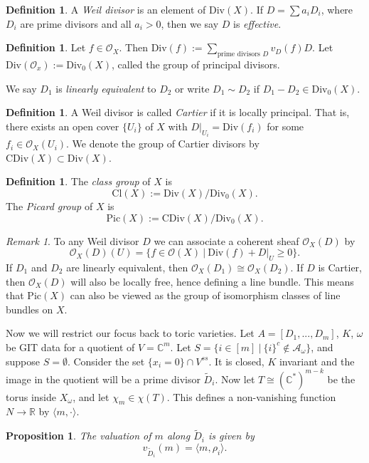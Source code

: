 \documentclass{article}
\newtheorem{prop}[theorem]{Proposition}
\theoremstyle{definition}
\newtheorem{definition}[theorem]{Definition}
\theoremstyle{remark}
\newtheorem{remark}[theorem]{Remark}
\numberwithin{theorem}{section}
\newcommand{\C}{\mathbb{C}}
\newcommand{\R}{\mathbb{R}}
\newcommand{\OO}{\mathcal{O}}
\newcommand{\cA}{\mathcal{A}}
\newcommand{\Div}{\mathrm{Div}}
\newcommand{\Pic}{\mathrm{Pic}}
\newcommand{\CDiv}{\mathrm{CDiv}}
\newcommand{\Cl}{\mathrm{Cl}}
\begin{document}
	\begin{definition}
		A \emph{Weil divisor} is an element of $\Div(X)$. If $D=\sum a_i D_i$, where $D_i$ are prime divisors and all $a_i >0$, then we say $D$ is \emph{effective}.
	\end{definition}
	\begin{definition}
		Let $f \in \mathcal{O}_X$. Then $\Div(f):=\sum_{\text{prime divisors }D}v_D(f)D$. Let $\Div(\mathcal{O}_x):=\Div_0(X)$, called the group of principal divisors. \vspace{1em}

		We say $D_1$ is \emph{linearly equivalent} to $D_2$ or write $D_1\sim D_2$ if $D_1-D_2 \in \Div_0(X)$. 
	\end{definition}
	\begin{definition}
		A Weil divisor is called \emph{Cartier} if it is locally principal. That is, there exists an open cover $\{U_i\}$ of $X$ with $D|_{U_i} = \Div(f_i)$ for some $f_i \in \mathcal{O}_X(U_i)$. We denote the group of Cartier divisors by $\CDiv(X)\subset \Div(X)$. 
	\end{definition}
	\begin{definition}
		The \emph{class group} of $X$ is
		$$\Cl(X) := \Div(X)/\Div_0(X).$$
		The \emph{Picard group} of $X$ is 
		$$\Pic(X) := \CDiv(X)/\Div_0(X).$$
	\end{definition}
	\begin{remark}
		To any Weil divisor $D$ we can associate a coherent sheaf $\OO_X(D)$ by
		$$\OO_X(D)(U) = \{f\in \OO(X) ~|~ \Div(f)+D|_U \geq 0 \}.$$
		If $D_1$ and $D_2$ are linearly equivalent, then $\OO_X(D_1) \cong \OO_X(D_2)$. If $D$ is Cartier, then $\OO_X(D)$ will also be locally free, hence defining a line bundle. This means that $\Pic(X)$ can also be viewed as the group of isomorphism classes of line bundles on $X$.
	\end{remark}
	Now we will restrict our focus back to toric varieties. Let $A=[D_1,...,D_m]$, $K$, $\omega$ be GIT data for a quotient of $V=\C^m$. Let $S=\{i \in [m] ~|~ \{i\}^c \not\in \cA_\omega \}$, and suppose $S=\emptyset$. Consider the set $\{x_i=0\}\cap V^{ss}$. It is closed, $K$ invariant and the image in the quotient will be a prime divisor $\tilde{D}_i$. Now let $T\cong(\C^\ast)^{m-k}$ be the torus inside $X_\omega$, and let $\chi_m\in \chi(T)$. This defines a non-vanishing function $N\to \R$ by $\langle m, \cdot \rangle$. 
	\begin{prop}
		The valuation of $m$ along $\tilde{D}_i$ is given by
		$$v_{\tilde{D}_i}(m) = \langle m, \rho_i\rangle.$$
	\end{prop}
\end{document}
